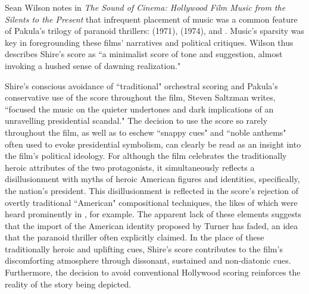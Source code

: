 Sean Wilson notes in \textit{The Sound of Cinema: Hollywood Film Music from the Silents to the Present} that infrequent placement of music was a common feature of Pakula's trilogy of paranoid thrillers:  (1971),  (1974), and .
Music's sparsity was key in foregrounding these films' narratives and political critiques.
Wilson thus describes Shire's score as ``a minimalist score of tone and suggestion, almost invoking a hushed sense of dawning realization."\autocites[][119]{wilson_sound_2022}

Shire's conscious avoidance of ``traditional" orchestral scoring and Pakula's conservative use of the score throughout the film, Steven Saltzman writes, ``focused the music on the quieter undertones and dark implications of an unravelling presidential scandal."\autocites[][34]{saltzman_music_2015}
The decision to use the score so rarely throughout the film, as well as to eschew ``snappy cues" and ``noble anthems" often used to evoke presidential symbolism, can clearly be read as an insight into the film's political ideology.\autocites[][34]{saltzman_music_2015}
For although the film celebrates the traditionally heroic attributes of the two protagonists, it simultaneously reflects a disillusionment with myths of heroic American figures and identities, specifically, the nation's president.
This disillusionment is reflected in the score's rejection of overtly traditional ``American" compositional techniques, the likes of which were heard prominently in , for example.
The apparent lack of these elements suggests that the import of the American identity proposed by Turner has faded, an idea that the paranoid thriller often explicitly claimed.
In the place of these traditionally heroic and uplifting cues, Shire's score contributes to the film's discomforting atmosphere through dissonant, sustained and non-diatonic cues.
Furthermore, the decision to avoid conventional Hollywood scoring reinforces the reality of the story being depicted.

